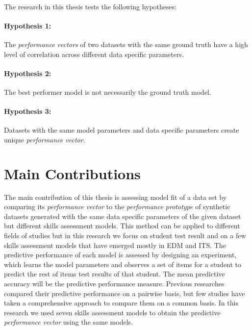 \paragraph{}The research in this thesis tests the following hypotheses:
\paragraph{Hypothesis 1:} The \textit{performance vectors} of two datasets with the same ground truth have a high level of correlation across different data specific parameters. 
\paragraph{Hypothesis 2:} The best performer model is not necessarily the ground truth model.
\paragraph{Hypothesis 3:} Datasets with the same model parameters and data specific parameters create unique \textit{performance vector}. 

\section{Main Contributions}

The main contribution of this thesis is assessing model fit of a data set by comparing its \textit{performance vector} to the \textit{performance prototype} of synthetic datasets generated with the same data specific parameters of the given dataset but different skills assessment models. This method can be applied to different fields of studies but in this research we focus on student test result and on a few skills assessment models that have emerged mostly in EDM and ITS. The predictive performance of each model is assessed by designing an experiment, which learns the model parameters and observes a set of items for a student to predict the rest of items test results of that student. The mean predictive accuracy will be the predictive performance measure. Previous researches compared their predictive performance on a pairwise basis, but few studies have taken a comprehensive approach to compare them on a common basis. In this research we used seven skills assessment models to obtain the predictive \textit{performance vector} using the same models. 

